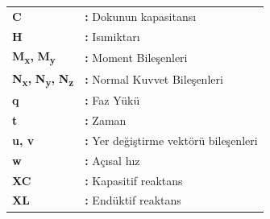 \hspace{-3mm}
\begin{tabular}{p{2cm}l}
{\bf{C}} & {\bf:} Dokunun kapasitans\i\\
{\bf H} & {\bf:} Is\i miktar\i\\
{\bf M\textsubscript{x},} {\bf M\textsubscript{y}} & {\bf:} Moment Bile\c{s}enleri\\
{\bf N\textsubscript{x},} {\bf N\textsubscript{y},} {\bf N\textsubscript{z}} & {\bf:} Normal Kuvvet Bile\c{s}enleri\\
{\bf q} & {\bf:} Faz Y\"uk\"u\\
{\bf t} & {\bf:} Zaman\\
{\bf u, v} & {\bf:} Yer de\u{g}i\c{s}tirme vekt\"or\"u bile\c{s}enleri\\
{\bf w} & {\bf:} A\c{c}\i sal h\i z\\
{\bf XC} & {\bf:} Kapasitif reaktans\\
{\bf XL} & {\bf:} End\"uktif reaktans\\
\end{tabular}

